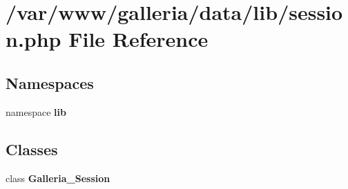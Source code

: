 \section{/var/www/galleria/data/lib/session.php File Reference}
\label{session_8php}
\subsection*{Namespaces}
\begin{CompactItemize}
\item 
namespace {\bf lib}
\end{CompactItemize}
\subsection*{Classes}
\begin{CompactItemize}
\item 
class {\bf Galleria\_\-Session}
\end{CompactItemize}
